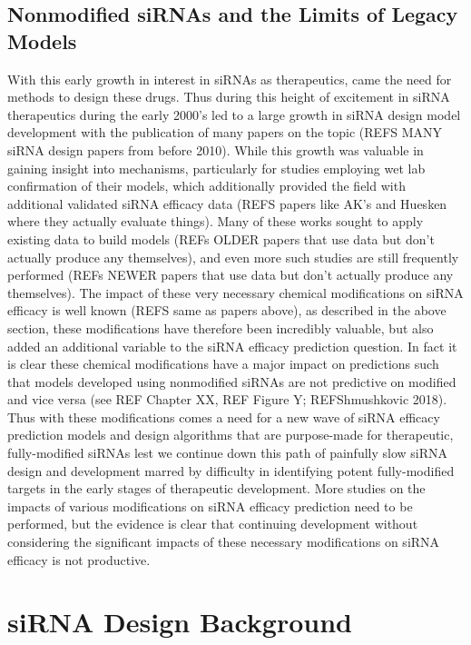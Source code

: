 \documentclass{report}
\begin{document}
\subsection{Nonmodified siRNAs and the Limits of Legacy Models}
With this early growth in interest in siRNAs as therapeutics, came the need for methods to design these drugs. Thus during this height of excitement in siRNA therapeutics during the early 2000’s led to a large growth in siRNA design model development with the publication of many papers on the topic (REFS MANY siRNA design papers from before 2010). While this growth was valuable in gaining insight into mechanisms, particularly for studies employing wet lab confirmation of their models, which additionally provided the field with additional validated siRNA efficacy data (REFS papers like AK’s and Huesken where they actually evaluate things). Many of these works sought to apply existing data to build models (REFs OLDER papers that use data but don’t actually produce any themselves), and even more such studies are still frequently performed (REFs NEWER papers that use data but don’t actually produce any themselves). The impact of these very necessary chemical modifications on siRNA efficacy is well known (REFS same as papers above), as described in the above section, these modifications have therefore been incredibly valuable, but also added an additional variable to the siRNA efficacy prediction question. In fact it is clear these chemical modifications have a major impact on predictions such that models developed using nonmodified siRNAs are not predictive on modified and vice versa (see REF Chapter XX, REF Figure Y; REFShmushkovic 2018). Thus with these modifications comes a need for a new wave of siRNA efficacy prediction models and design algorithms that are purpose-made for therapeutic, fully-modified siRNAs lest we continue down this path of painfully slow siRNA design and development marred by difficulty in identifying potent fully-modified targets in the early stages of therapeutic development. More studies on the impacts of various modifications on siRNA efficacy prediction need to be performed, but the evidence is clear that continuing development without considering the significant impacts of these necessary modifications on siRNA efficacy is not productive. 



\section{siRNA Design Background}
\end{document}
